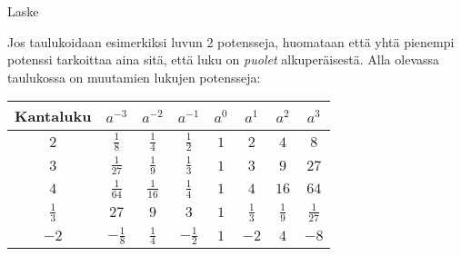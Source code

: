    \begin{esimerkki}
        Laske
    \end{esimerkki}

Jos taulukoidaan esimerkiksi luvun 2 potensseja, huomataan että
yhtä pienempi potenssi tarkoittaa aina sitä, että luku on \emph{puolet}
alkuperäisestä. Alla olevassa taulukossa on muutamien lukujen potensseja:
   


\begin{tabular}{c|c c c c c c c}
Kantaluku & $a^{-3}$ & $a^{-2}$ & $a^{-1}$ & $a^0$ & $a^1$ & $a^2$ & $a^3$ \\
\hline
$2$ & $\frac{1}{8}$ & $\frac{1}{4}$ & $\frac{1}{2}$ & $1$ & $2$ & $4$ & $8$ \\
$3$ & $\frac{1}{27}$ & $\frac{1}{9}$ & $\frac{1}{3}$ & $1$ & $3$ & $9$ & $27$ \\
$4$ & $\frac{1}{64}$ & $\frac{1}{16}$ & $\frac{1}{4}$ & $1$ & $4$ & $16$ & $64$ \\
$\frac{1}{3}$ & $27$ & $9$ & $3$ & $1$ & $\frac{1}{3}$ & $\frac{1}{9}$ & $\frac{1}{27}$ \\
$-2$ & $-\frac{1}{8}$ & $\frac{1}{4}$ & $-\frac{1}{2}$ & $1$ & $-2$ & $4$ & $-8$
\end{tabular}
